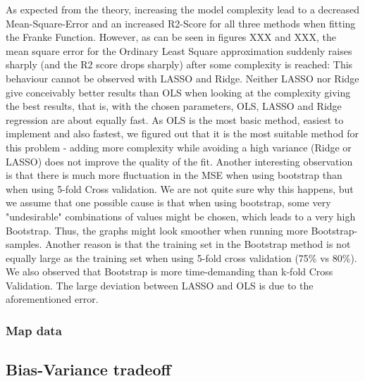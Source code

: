 \documentclass[11pt,a4paper]{article}
\begin{document}
As expected from the theory, increasing the model complexity lead to a decreased Mean-Square-Error and an increased R2-Score for all three methods when fitting the Franke Function. However, as can be seen in figures XXX and XXX, the mean square error for the Ordinary Least Square approximation suddenly raises sharply (and the R2 score drops sharply) after some complexity is reached: This behaviour cannot be observed with LASSO and Ridge. Neither LASSO nor Ridge give conceivably better results than OLS when looking at the complexity giving the best results, that is, with the chosen parameters, OLS, LASSO and Ridge regression are about equally fast. As OLS is the most basic method, easiest to implement and also fastest, we figured out that it is the most suitable method for this problem - adding more complexity while avoiding a high variance (Ridge or LASSO) does not improve the quality of the fit.  Another interesting observation is that there is much more fluctuation in the MSE when using bootstrap than when using 5-fold Cross validation. We are not quite sure why this happens, but we assume that one possible cause is that when using bootstrap, some very "undesirable" combinations of values might be chosen, which leads to a very high Bootstrap. Thus, the graphs might look smoother when running more Bootstrap-samples. Another reason is that the training set in the Bootstrap method is not equally large as the training set when using 5-fold cross validation (75\% vs 80\%). We also observed that Bootstrap is more time-demanding than k-fold Cross Validation. The large deviation between LASSO and OLS is due to the aforementioned error.
\subsubsection{Map data}
\subsection{Bias-Variance tradeoff}
\end{document}

